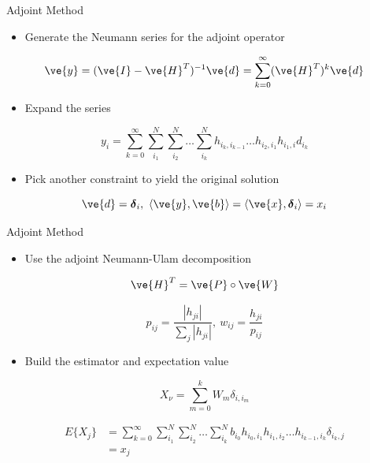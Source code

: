 \documentclass{beamer}
\begin{document}
\begin{frame}{Adjoint Method}

  \begin{itemize}
  \item Generate the Neumann series for the adjoint operator
  \end{itemize}

  \[
  \ve{y} = (\ve{I} - \ve{H}^T)^{-1} \ve{d} = \sum_{k=0}^{\infty}
  (\ve{H}^T)^k\ve{d}
  \]

  \medskip
  \begin{itemize}
  \item Expand the series
  \end{itemize}

  \[
  y_i = \sum_{k=0}^{\infty}\sum_{i_1}^{N}\sum_{i_2}^{N}\ldots
  \sum_{i_k}^{N}h_{i_k,i_{k-1}}\ldots h_{i_2,i_1} h_{i_1,i} d_{i_k}
  \]

  \medskip
  \begin{itemize}
  \item Pick another constraint to yield the original solution
  \end{itemize}

  \[
  \ve{d} = \boldsymbol{\delta}_i,\ \langle \ve{y}, \ve{b} \rangle =
  \langle \ve{x}, \boldsymbol{\delta}_i \rangle = x_i
  \]
  
\end{frame}

\begin{frame}{Adjoint Method}

  \begin{itemize}
  \item Use the adjoint Neumann-Ulam decomposition
  \end{itemize}

  \[
  \ve{H}^{T} = \ve{P} \circ \ve{W}
  \]

  \[
  p_{ij} = \frac{|h_{ji}|}{\sum_j |h_{ji}|},\ w_{ij} =
  \frac{h_{ji}}{p_{ij}}
  \]

  \medskip
  \begin{itemize}
  \item Build the estimator and expectation value
  \end{itemize}

  \[
  X_{\nu} = \sum_{m=0}^k W_{m} \delta_{i,i_m}
  \]

  \[
  \begin{split}
    E\{X_j\} &=\sum_{k=0}^{\infty}\sum_{i_1}^{N}\sum_{i_2}^{N}\ldots
    \sum_{i_k}^{N} b_{i_0} h_{i_0,i_1}h_{i_1,i_2}\ldots h_{i_{k-1},i_k}
    \delta_{i_k,j} \\ &= x_{j}
  \end{split}
  \]

\end{frame}
\end{document}
